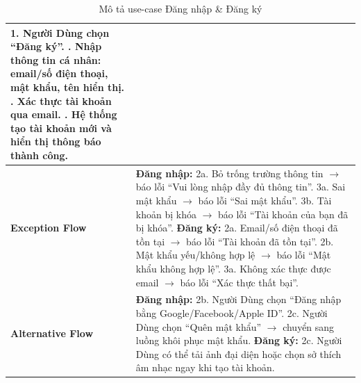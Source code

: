\documentclass[a4paper]{article}
\begin{document}
\begin{table}[H]
\begin{tabularx}{\textwidth}{|l|X|}
		1. Người Dùng chọn “Đăng ký”. \newline
		2. Nhập thông tin cá nhân: email/số điện thoại, mật khẩu, tên hiển thị. \newline
		3. Xác thực tài khoản qua email. \newline
		4. Hệ thống tạo tài khoản mới và hiển thị thông báo thành công.                                                                                                                        \\ \hline
		\textbf{Exception Flow}
		                       & \textbf{Đăng nhập:} \newline
		2a. Bỏ trống trường thông tin $\rightarrow$ báo lỗi “Vui lòng nhập đầy đủ thông tin”. \newline
		3a. Sai mật khẩu $\rightarrow$ báo lỗi “Sai mật khẩu”. \newline
		3b. Tài khoản bị khóa $\rightarrow$ báo lỗi “Tài khoản của bạn đã bị khóa”.
		\textbf{Đăng ký:} \newline
		2a. Email/số điện thoại đã tồn tại $\rightarrow$ báo lỗi “Tài khoản đã tồn tại”. \newline
		2b. Mật khẩu yếu/không hợp lệ $\rightarrow$ báo lỗi “Mật khẩu không hợp lệ”. \newline
		3a. Không xác thực được email $\rightarrow$ báo lỗi “Xác thực thất bại”.                                                                                                               \\ \hline
		\textbf{Alternative Flow}
		                       & \textbf{Đăng nhập:} \newline
		2b. Người Dùng chọn “Đăng nhập bằng Google/Facebook/Apple ID”. \newline
		2c. Người Dùng chọn “Quên mật khẩu” $\rightarrow$ chuyển sang luồng khôi phục mật khẩu. \newline
		\textbf{Đăng ký:} \newline
		2c. Người Dùng có thể tải ảnh đại diện hoặc chọn sở thích âm nhạc ngay khi tạo tài khoản.                                                                                              \\ \hline
	\end{tabularx}
	\caption{Mô tả use-case Đăng nhập \& Đăng ký}
\end{table}

\end{document}
